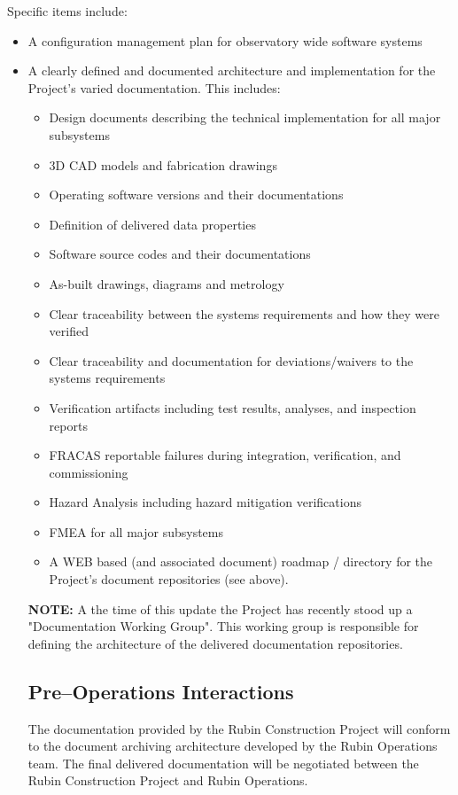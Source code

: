 Specific items include:

\begin{itemize}
	\item A configuration management plan for observatory wide software systems
	\item A clearly defined and documented architecture and implementation for the Project's varied documentation.  This includes:
	\begin{itemize}
		\item Design documents describing the technical implementation for all major subsystems
		\item 3D CAD models and fabrication drawings
		\item Operating software versions and their documentations
		\item Definition of delivered data properties
		\item Software source codes and their documentations
		\item As-built drawings, diagrams and metrology
		\item Clear traceability between the systems requirements and how they were verified
		\item Clear traceability and documentation for deviations/waivers to the systems requirements
		\item Verification artifacts including test results, analyses, and inspection reports
		\item FRACAS reportable failures during integration, verification, and commissioning
		\item Hazard Analysis including hazard mitigation verifications
		\item FMEA for all major subsystems
	\item A WEB based (and associated document) roadmap / directory for the Project's document repositories (see above).
\end{itemize}

{\bf NOTE:} A the time of this update the Project has recently stood up a "Documentation Working Group".  This working group is responsible for defining the architecture of the delivered documentation repositories.

\subsection{Pre--Operations Interactions}

The documentation provided by the Rubin Construction Project will conform to the document archiving architecture developed by the Rubin Operations team.  The final delivered documentation will be negotiated between the Rubin Construction Project and Rubin Operations.


\end{itemize}
